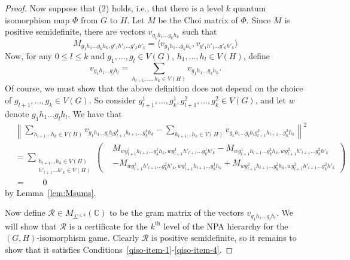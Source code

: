 \documentclass[11pt,a4paper]{article}
\theoremstyle{plain}
\theoremstyle{remark}
\theoremstyle{definition}
\begin{document}
\begin{proof}
Now suppose that (2) holds, i.e., that there is a level $k$ quantum isomorphism map $\Phi$ from $G$ to $H$. Let $M$ be the Choi matrix of $\Phi$. Since $M$ is positive semidefinite, there are vectors $v_{g_1h_1\ldots g_kh_k}$ such that
\begin{equation}
    M_{g_1h_1\ldots g_kh_k,g'_{1}h'_{1}\ldots g'_{k}h'_{k}} = \langle v_{g_1h_1\ldots g_kh_k}, v_{g'_{1}h'_{1}\ldots g'_{k}h'_{k}}\rangle
\end{equation}
Now, for any $0 \le l \le k$ and $g_1, \ldots, g_l \in V(G)$, $h_1, \ldots, h_l \in V(H)$, define
\begin{equation}
    v_{g_1h_1\ldots g_lh_l} = \sum_{h_{l+1},\ldots, h_{k} \in V(H)} v_{g_1h_1\ldots g_kh_k}.
\end{equation}
Of course, we must show that the above definition does not depend on the choice of $g_{l+1}, \ldots, g_{k} \in V(G)$. So consider $g^1_{l+1}, \ldots, g^1_{k}, g^2_{l+1}, \ldots, g^2_{k} \in V(G)$, and let $w$ denote $g_1h_1\ldots g_lh_l$. We have that
\begin{align*}
        & \left \| \sum_{h_{l+1} \dots h_k \in V(H) } v_{g_1h_1 \dots g_l h_l g^1_{l+1}h_{l+1} \dots g^1_k h_k} - \sum_{h_{l+1} \dots h_k \in V(H)} v_{g_1h_1 \dots g_l h_l g^2_{l+1}h_{l+1} \dots g^2_k h_k} \right\| ^2 \\
        & = \sum_{\substack{h_{l+1} \dots h_k \in V(H) \\ h'_{l+1} \dots h'_k \in V(H)}} \left( \begin{aligned} & M_{w g^1_{l+1}h_{l+1} \dots g^1_k h_k, w g^1_{l+1}h'_{l+1} \dots g^1_k h'_k} - M_{w g^1_{l+1}h_{l+1} \dots g^1_k h_k, w g^2_{l+1}h'_{l+1} \dots g^2_k h'_k} \\
        & - M_{w g^2_{l+1}h'_{l+1} \dots g^2_k h'_k, w g^1_{l+1}h_{l+1} \dots g^1_k h_k} + M_{w g^2_{l+1}h_{l+1} \dots g^2_k h_k, w g^2_{l+1}h'_{l+1} \dots g^2_k h'_k} 
        \end{aligned} \right ) \\
& = \qquad 0
    \end{align*}
by Lemma~\ref{lem:Msums}.

Now define $\mathcal{R} \in M_{\Sigma^{\le k}}(\mathbb{C})$ to be the gram matrix of the vectors $v_{g_1h_1\ldots g_lh_l}$. We will show that $\mathcal{R}$ is a certificate for the $k^\text{th}$ level of the NPA hierarchy for the $(G,H)$-isomorphism game. Clearly $\mathcal{R}$ is positive semidefinite, so it remains to show that it satisfies Conditions~\ref{qiso-item-1}-\ref{qiso-item-4}.


\end{proof}
\end{document}
